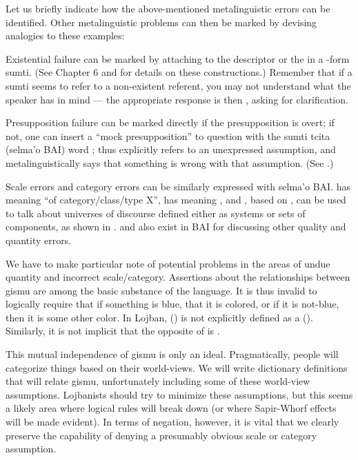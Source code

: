 Let us briefly indicate how the above-mentioned
    metalinguistic errors can be identified. Other metalinguistic
    problems can then be marked by devising analogies to these
    examples:

Existential failure can be marked by attaching  to
    the descriptor  or the  in a -form
    sumti. (See Chapter 6 and 
    for details on these constructions.) Remember that if a 
    sumti seems to refer to a non-existent referent, you may not
    understand what the speaker has in mind --- the appropriate
    response is then , asking for clarification.

Presupposition failure can be marked directly if the
    presupposition is overt; if not, one can insert a ``mock
    presupposition'' to question with the sumti tcita (selma'o BAI)
    word ;  thus explicitly refers to an
    unexpressed assumption, and  metalinguistically
    says that something is wrong with that assumption. (See .)

Scale errors and category errors can be similarly expressed
    with selma'o BAI.  has meaning ``of category/class/type
    X'',  has meaning , and , based
    on , can be used to talk about universes of discourse
    defined either as systems or sets of components, as shown in .  and  also exist in
    BAI for discussing other quality and quantity errors.

We have to make particular note of potential problems in the
    areas of undue quantity and incorrect scale/category.
    Assertions about the relationships between gismu are among the
    basic substance of the language. It is thus invalid to
    logically require that if something is blue, that it is
    colored, or if it is not-blue, then it is some other color. In
    Lojban,  () is not explicitly defined as a
     (). Similarly, it is not implicit that the
    opposite of  is .

This mutual independence of gismu is only an ideal.
    Pragmatically, people will categorize things based on their
    world-views. We will write dictionary definitions that will
    relate gismu, unfortunately including some of these world-view
    assumptions. Lojbanists should try to minimize these
    assumptions, but this seems a likely area where logical rules
    will break down (or where Sapir-Whorf effects will be made
    evident). In terms of negation, however, it is vital that we
    clearly preserve the capability of denying a presumably obvious
    scale or category assumption.

